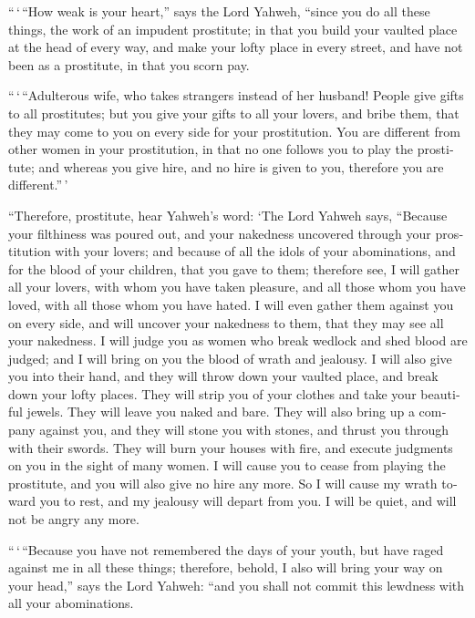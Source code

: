 \begin{paracol}{2}
\begin{otherlanguage}{english}
 ``\,`\,``How weak is your heart,'' says the Lord Yahweh,
``since you do all these things, the work of an impudent prostitute;
 in that you build your vaulted place at the head of
every way, and make your lofty place in every street, and have not been
as a prostitute, in that you scorn pay.

 ``\,`\,``Adulterous wife, who takes strangers instead of
her husband!  People give gifts to all prostitutes; but
you give your gifts to all your lovers, and bribe them, that they may
come to you on every side for your prostitution.  You are
different from other women in your prostitution, in that no one follows
you to play the prostitute; and whereas you give hire, and no hire is
given to you, therefore you are different.''\,'

 ``Therefore, prostitute, hear Yahweh's word:
 `The Lord Yahweh says, ``Because your filthiness was
poured out, and your nakedness uncovered through your prostitution with
your lovers; and because of all the idols of your abominations, and for
the blood of your children, that you gave to them; 
therefore see, I will gather all your lovers, with whom you have taken
pleasure, and all those whom you have loved, with all those whom you
have hated. I will even gather them against you on every side, and will
uncover your nakedness to them, that they may see all your nakedness.
 I will judge you as women who break wedlock and shed
blood are judged; and I will bring on you the blood of wrath and
jealousy.  I will also give you into their hand, and they
will throw down your vaulted place, and break down your lofty places.
They will strip you of your clothes and take your beautiful jewels. They
will leave you naked and bare.  They will also bring up a
company against you, and they will stone you with stones, and thrust you
through with their swords.  They will burn your houses
with fire, and execute judgments on you in the sight of many women. I
will cause you to cease from playing the prostitute, and you will also
give no hire any more.  So I will cause my wrath toward
you to rest, and my jealousy will depart from you. I will be quiet, and
will not be angry any more.

 ``\,`\,``Because you have not remembered the days of
your youth, but have raged against me in all these things; therefore,
behold, I also will bring your way on your head,'' says the Lord Yahweh:
``and you shall not commit this lewdness with all your abominations.


\end{otherlanguage}
\end{paracol}
